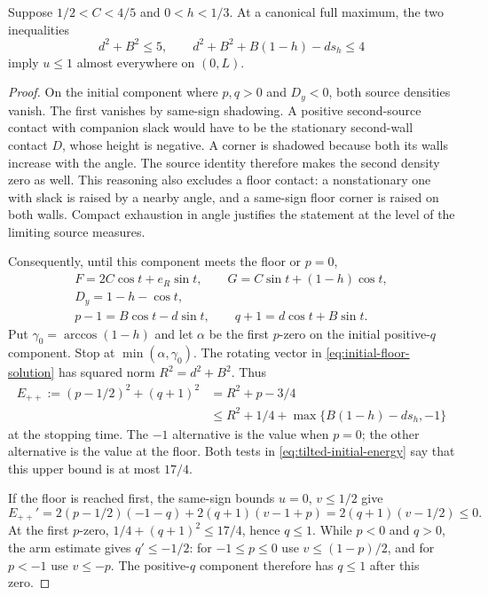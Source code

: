 \begin{lemma}\label{lem:tilted-initial-energy}
Suppose $1/2<C<4/5$ and $0<h<1/3$. At a canonical full
maximum, the two inequalities
\begin{equation}\label{eq:tilted-initial-energy}
 d^2+B^2\le5,\qquad
 d^2+B^2+B(1-h)-d s_h\le4
\end{equation}
imply $u\le1$ almost everywhere on $(0,L)$.
\end{lemma}
\begin{proof}
On the initial component where $p,q>0$ and $D_y<0$, both source
densities vanish. The first vanishes by same-sign shadowing.
A positive second-source contact with companion slack would have
to be the stationary second-wall contact $D$, whose height is
negative. A corner is shadowed because both its walls increase
with the angle. The source identity therefore makes the second
density zero as well. This reasoning also excludes a floor
contact: a nonstationary one with slack is raised by a nearby
angle, and a same-sign floor corner is raised on both walls.
Compact exhaustion in angle justifies the statement at the
level of the limiting source measures.

Consequently, until this component meets the floor or $p=0$,
\begin{equation}\label{eq:initial-floor-solution}
 \begin{gathered}
 F=2C\cos t+e_R\sin t,\qquad
 G=C\sin t+(1-h)\cos t,\\
 D_y=1-h-\cos t,\\
 p-1=B\cos t-d\sin t,\qquad
 q+1=d\cos t+B\sin t.
 \end{gathered}
\end{equation}
Put $\gamma_0=\arccos(1-h)$ and let $\alpha$ be the first
$p$-zero on the initial positive-$q$ component. Stop at
$\min(\alpha,\gamma_0)$. The rotating vector in
\cref{eq:initial-floor-solution} has squared norm $R^2=d^2+B^2$.
Thus
\[
 \begin{aligned}
 E_{++}:=(p-1/2)^2+(q+1)^2&=R^2+p-3/4\\
 &\le R^2+1/4+\max\{B(1-h)-ds_h,-1\}
 \end{aligned}
\]
at the stopping time. The $-1$ alternative is the value when
$p=0$; the other alternative is the value at the floor.
Both tests in \cref{eq:tilted-initial-energy} say that this upper
bound is at most $17/4$.

If the floor is reached first, the same-sign bounds $u=0$,
$v\le1/2$ give
\[
 E_{++}'=2(p-1/2)(-1-q)+2(q+1)(v-1+p)
        =2(q+1)(v-1/2)\le0.
\]
At the first $p$-zero, $1/4+(q+1)^2\le17/4$, hence $q\le1$.
While $p<0$ and $q>0$, the arm estimate gives $q'\le-1/2$:
for $-1\le p\le0$ use $v\le(1-p)/2$, and for $p<-1$
use $v\le-p$. The positive-$q$ component therefore has $q\le1$
after this zero.


\end{proof}
